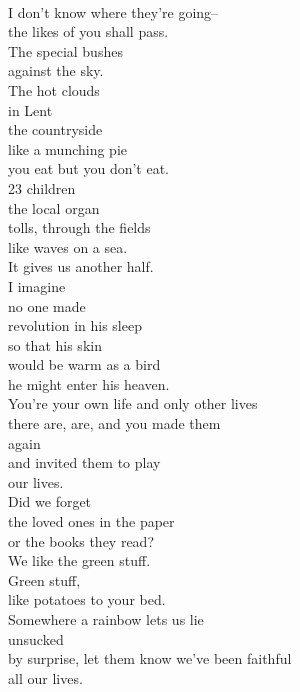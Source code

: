 \documentclass[smalldemyvopaper,11pt,twoside,onecolumn,openright,extrafontsizes]{memoir}
\begin{document}
\\I don't know where they're going--
\\the likes of you shall pass.
\\The special bushes
\\against the sky.
\\The hot clouds
\\in Lent
\\the countryside
\\like a munching pie
\\you eat but you don't eat.
\\23 children
\\the local organ
\\tolls, through the fields
\\like waves on a sea.
\\It gives us another half.
\\I imagine
\\no one made
\\revolution in his sleep
\\so that his skin
\\would be warm as a bird
\\he might enter his heaven.
\\You're your own life and only other lives
\\there are, are, and you made them
\\again
\\and invited them to play
\\our lives.
\\Did we forget
\\the loved ones in the paper
\\or the books they read?
\\We like the green stuff.
\\Green stuff,
\\like potatoes to your bed.
\\Somewhere a rainbow lets us lie
\\unsucked
\\by surprise, let them know we've been faithful
\\all our lives.
\end{document}

